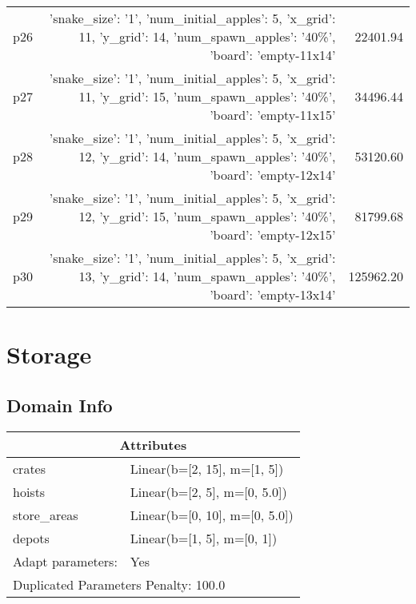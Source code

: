 \documentclass{article}
\begin{document}
\begin{center}
\begin{tabular}{@{}l|r|r@{}}
  p26&{'snake\_size': '1', 'num\_initial\_apples': 5, 'x\_grid': 11, 'y\_grid': 14, 'num\_spawn\_apples': '40\%', 'board': 'empty-11x14'}&22401.94\\
  p27&{'snake\_size': '1', 'num\_initial\_apples': 5, 'x\_grid': 11, 'y\_grid': 15, 'num\_spawn\_apples': '40\%', 'board': 'empty-11x15'}&34496.44\\
  p28&{'snake\_size': '1', 'num\_initial\_apples': 5, 'x\_grid': 12, 'y\_grid': 14, 'num\_spawn\_apples': '40\%', 'board': 'empty-12x14'}&53120.60\\
  p29&{'snake\_size': '1', 'num\_initial\_apples': 5, 'x\_grid': 12, 'y\_grid': 15, 'num\_spawn\_apples': '40\%', 'board': 'empty-12x15'}&81799.68\\
  p30&{'snake\_size': '1', 'num\_initial\_apples': 5, 'x\_grid': 13, 'y\_grid': 14, 'num\_spawn\_apples': '40\%', 'board': 'empty-13x14'}&125962.20
                            \end{tabular}
                            \end{center}
                    
                            \newpage \section{Storage}
                    \subsection*{Domain Info}

                    \begin{center}
                    \begin{tabular}{@{}p{}p{}@{}}
                    \multicolumn{2}{c}{\bf \large Attributes}\\\midrule
                    crates & Linear(b=[2, 15], m=[1, 5])\\
hoists & Linear(b=[2, 5], m=[0, 5.0])\\
store\_areas & Linear(b=[0, 10], m=[0, 5.0])\\
depots & Linear(b=[1, 5], m=[0, 1])
                    
                    \\\midrule
                    Adapt parameters: & Yes
                
                     \\\midrule
                    \multicolumn{2}{l}{Duplicated Parameters Penalty: 100.0}
                    \end{tabular}
                    \end{center}
                
\end{document}
